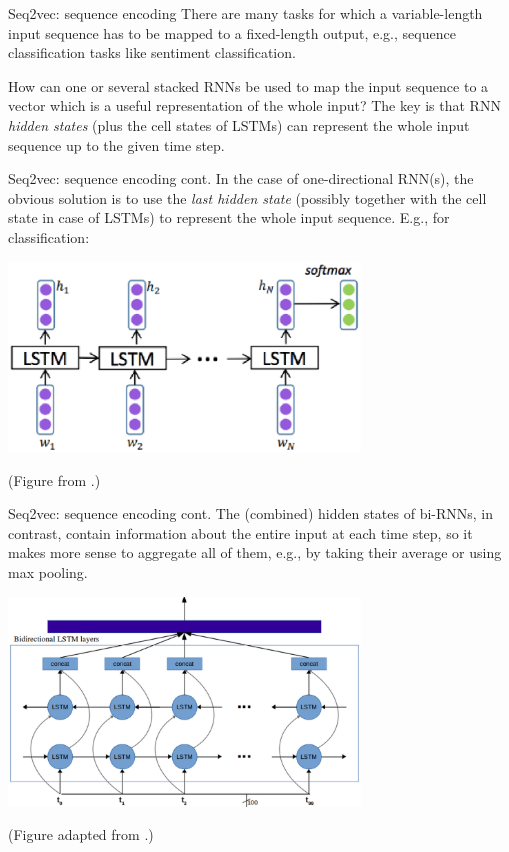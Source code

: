\documentclass[style=upen, size=14pt]{powerdot}
\theoremstyle{definition}
\begin{document}
\begin{slide}[toc=Sequence encoding]{Seq2vec: sequence encoding}
  There are many tasks for which a variable-length input sequence has to be
  mapped to a fixed-length output, e.g., sequence classification tasks like
  sentiment classification.\bigskip

  How can one or several stacked RNNs be used to map the input sequence to a
  vector which is a useful representation of the whole input? The key is that
  RNN \emph{hidden states} (plus the cell states of LSTMs) can
  represent the whole input sequence up to the given time step.
\end{slide}

\begin{slide}[toc=]{Seq2vec: sequence encoding cont.}
  In the case of one-directional RNN(s), the obvious solution is to use the
  \emph{last hidden state} (possibly together with the cell state in case of
  LSTMs) to represent the whole input sequence. E.g., for classification:
  \begin{center}
    \includegraphics[width=0.7\textwidth]{figures/seq2vec.eps}
    
    \footnotesize{(Figure from \cite{minaee2019deep}.)}
  \end{center}
\end{slide}

\begin{slide}[toc=]{Seq2vec: sequence encoding cont.}
  The (combined) hidden states of bi-RNNs, in contrast, contain information
  about the entire input at each time step, so it makes more sense to aggregate
  all of them, e.g., by taking their average or using max pooling.
    \begin{center}
    \includegraphics[width=0.7\textwidth]{figures/birnn_aggregation.eps}
    
    \footnotesize{(Figure adapted from \cite{faust2018automated}.)}
  \end{center}
\end{slide}
\end{document}
